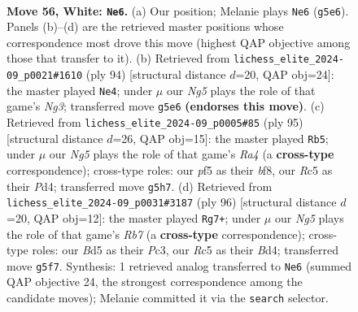 \documentclass[11pt]{article}
\begin{document}
\clearpage

\begin{figure}[p]\centering
\begin{subfigure}{0.46\textwidth}\centering
\resizebox{\linewidth}{!}{%
\newchessgame
\chessboard[
  setfen={3r4/k7/8/2RB1pNN/1P6/1K1b4/6P1/8 w - - 8 56},
  showmover=false,
  pgfstyle=straightmove, color=movearrow, markmove={g5-e6}
]}
\caption{}
\end{subfigure}\hfill
\begin{subfigure}{0.46\textwidth}\centering
\resizebox{\linewidth}{!}{%
\newchessgame
\chessboard[
  setfen={8/6pk/8/1bB1R3/1P6/6N1/2r5/6K1 w - - 3 48},
  showmover=false,
  pgfstyle=straightmove, color=movearrow, markmove={g3-e4}
]}
\caption{}
\end{subfigure}
\\[4pt]
\begin{subfigure}{0.46\textwidth}\centering
\resizebox{\linewidth}{!}{%
\newchessgame
\chessboard[
  setfen={5B2/8/2R1b3/r3pk2/3p4/5PK1/8/8 b - - 3 48},
  showmover=false,
  pgfstyle=straightmove, color=movearrow, markmove={a5-b5}
]}
\caption{}
\end{subfigure}\hfill
\begin{subfigure}{0.46\textwidth}\centering
\resizebox{\linewidth}{!}{%
\newchessgame
\chessboard[
  setfen={6k1/1R6/7p/6p1/3B4/r1P3Pb/5K2/8 w - - 0 49},
  showmover=false,
  pgfstyle=straightmove, color=movearrow, markmove={b7-g7}
]}
\caption{}
\end{subfigure}
\caption{\textbf{Move 56, White: \texttt{Ne6}.} (a) Our position; Melanie plays \texttt{Ne6} (\texttt{g5e6}). Panels (b)--(d) are the retrieved master positions whose correspondence most drove this move (highest QAP objective among those that transfer to it). (b) Retrieved from \texttt{lichess\_elite\_2024-09\_p0021\#1610} (ply 94) [structural distance $d$=20, QAP obj=24]: the master played \texttt{Ne4}; under $\mu$ our \emph{Ng5} plays the role of that game's \emph{Ng3}; transferred move \texttt{g5e6} \textbf{(endorses this move)}. (c) Retrieved from \texttt{lichess\_elite\_2024-09\_p0005\#85} (ply 95) [structural distance $d$=26, QAP obj=15]: the master played \texttt{Rb5}; under $\mu$ our \emph{Ng5} plays the role of that game's \emph{Ra4} (a \textbf{cross-type} correspondence); cross-type roles: our \emph{p}f5 as their \emph{b}f8, our \emph{R}c5 as their \emph{P}d4; transferred move \texttt{g5h7}. (d) Retrieved from \texttt{lichess\_elite\_2024-09\_p0031\#3187} (ply 96) [structural distance $d$=20, QAP obj=12]: the master played \texttt{Rg7+}; under $\mu$ our \emph{Ng5} plays the role of that game's \emph{Rb7} (a \textbf{cross-type} correspondence); cross-type roles: our \emph{B}d5 as their \emph{P}c3, our \emph{R}c5 as their \emph{B}d4; transferred move \texttt{g5f7}. Synthesis: 1 retrieved analog transferred to \texttt{Ne6} (summed QAP objective 24, the strongest correspondence among the candidate moves); Melanie committed it via the \texttt{search} selector.}
\label{fig:thought-m110}
\end{figure}
\end{document}
